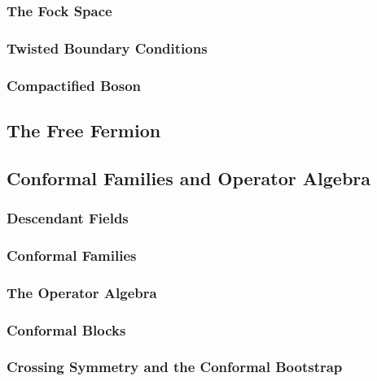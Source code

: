 \documentclass[10pt]{article}
\begin{document}
\subsubsection{The Fock Space}
\subsubsection{Twisted Boundary Conditions}
\subsubsection{Compactified Boson}
\subsection{The Free Fermion}


\subsection{Conformal Families and Operator Algebra}
\subsubsection{Descendant Fields}
\subsubsection{Conformal Families}
\subsubsection{The Operator Algebra}
\subsubsection{Conformal Blocks}
\subsubsection{Crossing Symmetry and the Conformal Bootstrap}

\clearpage
{}
\end{document}
